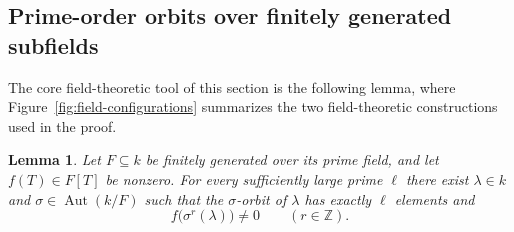 \documentclass[11pt,letterpaper,reqno]{amsart}
\newtheorem{lemma}[lemma]{Lemma}
\theoremstyle{definition}
\DeclareMathOperator{\Aut}{Aut}
\begin{document}
\subsection{Prime-order orbits over finitely generated subfields}

The core field-theoretic tool of this section is the following lemma, where Figure~\ref{fig:field-configurations} summarizes
the two field-theoretic constructions used in the proof.


\begin{lemma}\label{lem:prime-orbits}
Let $F\subseteq k$ be finitely generated over its prime field, and let
$f(T)\in F[T]$ be nonzero.  For every sufficiently large prime $\ell$ there
exist $\lambda\in k$ and $\sigma\in\Aut(k/F)$ such that the $\sigma$-orbit
of $\lambda$ has exactly $\ell$ elements and
\[
f\bigl(\sigma^r(\lambda)\bigr)\neq0
\qquad(r\in\mathbb Z).
\]
\end{lemma}
\end{document}
